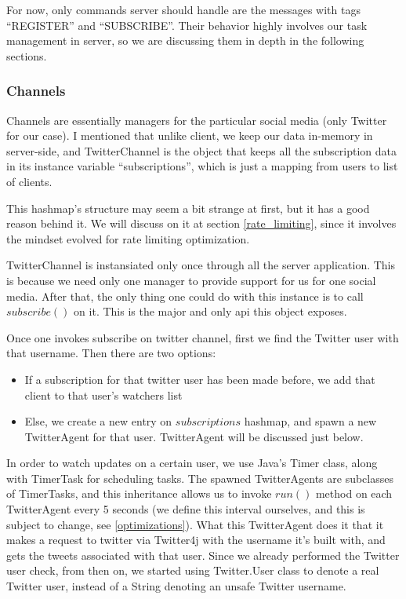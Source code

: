 \documentclass{article}
\begin{document}
\par For now, only commands server should handle are the messages with tags ``REGISTER'' and ``SUBSCRIBE''. Their behavior highly involves our task management in server, so we are discussing them in depth in the following sections.

\newpage

\subsubsection{Channels}
\label{channels}
Channels are essentially managers for the particular social media (only Twitter for our case). I mentioned that unlike client, we keep our data in-memory in server-side, and TwitterChannel is the object that keeps all the subscription data in its instance variable ``subscriptions'', which is just a mapping from users to list of clients.

\par This hashmap's structure may seem a bit strange at first, but it has a good reason behind it. We will discuss on it at section \ref{rate_limiting}, since it involves the mindset evolved for rate limiting optimization.

\par TwitterChannel is instansiated only once through all the server application. This is because we need only one manager to provide support for us for one social media. After that, the only thing one could do with this instance is to call $subscribe()$ on it. This is the major and only api this object exposes.

\par Once one invokes subscribe on twitter channel, first we find the Twitter user with that username. Then there are two options:
\begin{itemize}
  \item If a subscription for that twitter user has been made before, we add that client to that user's watchers list
  \item Else, we create a new entry on $subscriptions$ hashmap, and spawn a new TwitterAgent for that user. TwitterAgent will be discussed just below.
\end{itemize}

\par In order to watch updates on a certain user, we use Java's Timer class, along with TimerTask for scheduling tasks. The spawned TwitterAgents are subclasses of TimerTasks, and this inheritance allows us to invoke $run()$ method on each TwitterAgent every 5 seconds (we define this interval ourselves, and this is subject to change, see \ref{optimizations}). What this TwitterAgent does it that it makes a request to twitter via Twitter4j\cite{twitter4j} with the username it's built with, and gets the tweets associated with that user. Since we already performed the Twitter user check, from then on, we started using Twitter.User class to denote a real Twitter user, instead of a String denoting an unsafe Twitter username.
\end{document}
